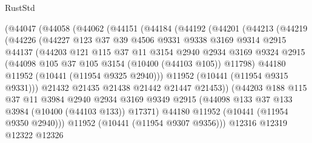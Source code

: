 \begin{lexlean}{RustStd}
\begin{coremodule}
            (@44047
              (@44058
                (@44062
                  (@44151
                    (@44184
                      (@44192
                        (@44201
                          (@44213
                            (@44219
                              (@44226
                                (@44227
                                  @123
                                  @37
                                  @39
                                  @4506
                                  @9331
                                  @9338
                                  @3169
                                  @9314
                                  @2915
                                  @44137
                                  (@44203
                                    @121
                                    @115
                                    @37
                                    @11
                                    @3154
                                    @2940
                                    @2934
                                    @3169
                                    @9324
                                    @2915
                                    (@44098 @105 @37 @105 @3154 (@10400 (@44103 @105)) @11798)
                                    @44180
                                    @11952
                                    (@10441 (@11954 @9325 @2940)))
                                  @11952
                                  (@10441 (@11954 @9315 @9331)))
                                @21432
                                @21435
                                @21438
                                @21442
                                @21447
                                @21453))
                            (@44203
                              @188
                              @115
                              @37
                              @11
                              @3984
                              @2940
                              @2934
                              @3169
                              @9349
                              @2915
                              (@44098 @133 @37 @133 @3984 (@10400 (@44103 @133)) @17371)
                              @44180
                              @11952
                              (@10441 (@11954 @9350 @2940)))
                            @11952
                            (@10441 (@11954 @9307 @9356)))
                          @12316
                          @12319
                          @12322
                          @12326

\end{coremodule}
\end{lexlean}
